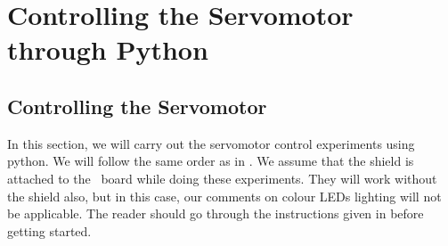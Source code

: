 \section{Controlling the Servomotor through Python}
\subsection{Controlling the Servomotor}
\label{sec:servo-py}
In this section, we will carry out the servomotor control experiments
using python.  We will follow the same order as in
.  We assume that the shield is attached to the
\arduino\ board while doing these experiments.  They will work without
the shield also, but in this case, our comments on colour LEDs
lighting will not be applicable.  The reader should go through the
instructions given in  before getting started.
